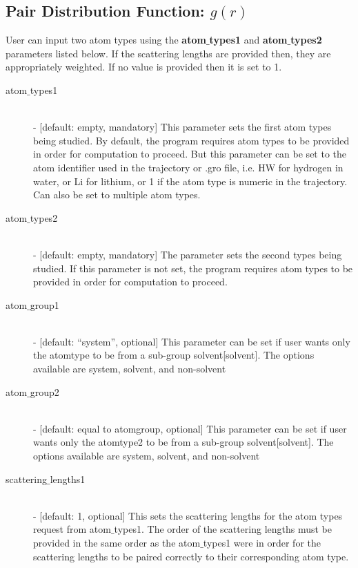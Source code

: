 \documentclass{article}
\begin{document}
\subsection{Pair Distribution Function: $g(r)$} \label{sec::gofr_parm}
User can input two atom types using the \textbf{atom$\_$types1} and \textbf{atom$\_$types2} parameters listed below.  If the scattering lengths are provided then, they are appropriately weighted. If no value is provided then it is set to 1.
\begin{description}	
	\item[atom$\_$types1] \hfill \\
	- [default: empty, mandatory] This parameter sets the first atom types being studied.  By default, the program requires atom types to be provided in order for computation to proceed.  But this parameter can be set to the atom identifier used in the trajectory or .gro file, i.e. HW for hydrogen in water, or Li for lithium, or 1 if the atom type is numeric in the trajectory.  Can also be set to multiple atom types.
	
	\item[atom$\_$types2] \hfill \\
	- [default: empty, mandatory] The parameter sets the second types being studied.  If this parameter is not set, the program requires atom types to be provided in order for computation to proceed.
	
	\item[atom$\_$group1] \hfill \\
	- [default: ``system'', optional] This parameter can be set if user wants only the atomtype to be from a sub-group solvent[solvent].  The options available are system, solvent, and non-solvent
	
	\item[atom$\_$group2] \hfill \\
	- [default: equal to atomgroup, optional] This parameter can be set if user wants only the atomtype2 to be from a sub-group solvent[solvent].  The options available are system, solvent, and non-solvent
	
	\item[scattering$\_$lengths1] \hfill \\
	- [default: 1, optional] This sets the scattering lengths for the atom types request from atom$\_$types1.  The order of the scattering lengths must be provided in the same order as the atom$\_$types1 were in order for the scattering lengths to be paired correctly to their corresponding atom type. 
		

\end{description}
\end{document}
